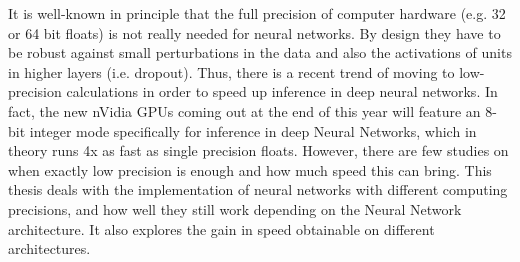 It is well-known in principle that the full precision of computer hardware (e.g. 32 or 64 bit floats) is not really needed for neural networks. By design they have to be robust against small perturbations in the data and also the activations of units in higher layers (i.e. dropout). Thus, there is a recent trend of moving to low-precision calculations in order to speed up inference in deep neural networks. In fact, the new nVidia GPUs coming out at the end of this year will feature an 8-bit integer mode specifically for inference in deep Neural Networks, which in theory runs 4x as fast as single precision floats. However, there are few studies on when exactly low precision is enough and how much speed this can bring. This thesis deals with the implementation of neural networks with different computing precisions, and how well they still work depending on the Neural Network architecture. It also explores the gain in speed obtainable on different architectures.